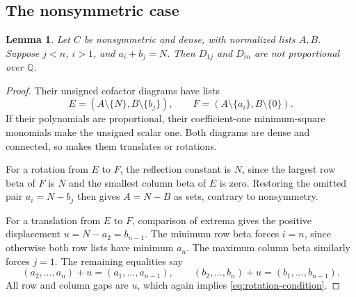 \documentclass[11pt,a4paper]{amsart}
\numberwithin{equation}{section}
\theoremstyle{plain}
\newtheorem{lemma}[theorem]{Lemma}
\theoremstyle{definition}
\newcommand{\Q}{\mathbb Q}
\begin{document}
\subsection{The nonsymmetric case}

\begin{lemma}\label{lem:boundary-pair}
Let \(C\) be nonsymmetric and dense, with normalized lists \(A,B\).
Suppose \(j<n\), \(i>1\), and \(a_i+b_j=N\).
Then \(D_{1j}\) and \(D_{in}\) are not proportional over \(\Q\).
\end{lemma}

\begin{proof}
Their unsigned cofactor diagrams have lists
\[
 E=(A\setminus\{N\},B\setminus\{b_j\}),\qquad
 F=(A\setminus\{a_i\},B\setminus\{0\}).
\]
If their polynomials are proportional, their coefficient-one
minimum-square monomials make the unsigned scalar one.
Both diagrams are dense and connected, so
 makes them translates or rotations.

For a rotation from \(E\) to \(F\), the reflection constant is \(N\),
since the largest row beta of \(F\) is \(N\) and the smallest column beta
of \(E\) is zero.  Restoring the omitted pair
\(a_i=N-b_j\) then gives \(A=N-B\) as sets, contrary to nonsymmetry.

For a translation from \(E\) to \(F\), comparison of extrema gives the
positive displacement \(u=N-a_2=b_{n-1}\).
The minimum row beta forces \(i=n\), since otherwise both row lists have
minimum \(a_n\).  The maximum column beta similarly forces \(j=1\).
The remaining equalities say
\[
 (a_2,\ldots,a_n)+u=(a_1,\ldots,a_{n-1}),\qquad
 (b_2,\ldots,b_n)+u=(b_1,\ldots,b_{n-1}).
\]
All row and column gaps are \(u\), which again implies
\eqref{eq:rotation-condition}.
\end{proof}
\end{document}
